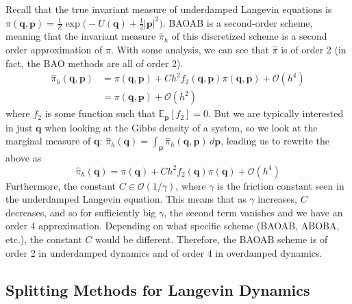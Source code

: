 \documentclass{article}
\begin{document}
      Recall that the true invariant measure of underdamped Langevin equations is $\pi(\mathbf{q}, \mathbf{p}) = \frac{1}{Z} \exp \big( -U(\mathbf{q}) + \frac{1}{2} |\mathbf{p}|^2 \big)$. BAOAB is a second-order scheme, meaning that the invariant measure $\hat{\pi}_h$ of this discretized scheme is a second order approximation of $\pi$. With some analysis, we can see that $\hat{\pi}$ is of order 2 (in fact, the BAO methods are all of order 2). 
      \begin{align*}
        \hat{\pi}_h (\mathbf{q}, \mathbf{p}) & = \pi(\mathbf{q}, \mathbf{p}) + C h^2 f_2 (\mathbf{q}, \mathbf{p}) \pi(\mathbf{q}, \mathbf{p}) + \mathcal{O}(h^4) \\
        & = \pi(\mathbf{q}, \mathbf{p}) + \mathcal{O}(h^2)
      \end{align*}
      where $f_2$ is some function such that $\mathbb{E}_\mathbf{p} [f_2] = 0$. But we are typically interested in just $\mathbf{q}$ when looking at the Gibbs density of a system, so we look at the marginal measure of $\mathbf{q}$: $\hat{\pi}_h (\mathbf{q}) = \int_\mathbf{p} \hat{\pi}_h (\mathbf{q}, \mathbf{p})\, d\mathbf{p}$, leading us to rewrite the above as
      \begin{equation}
        \hat{\pi}_h (\mathbf{q}) = \pi(\mathbf{q}) + C h^2 f_2 (\mathbf{q}) \pi(\mathbf{q}) + \mathcal{O}(h^4)
      \end{equation}
      Furthermore, the constant $C \in \mathcal{O}(1/ \gamma)$, where $\gamma$ is the friction constant seen in the underdamped Langevin equation. This means that as $\gamma$ increases, $C$ decreases, and so for sufficiently big $\gamma$, the second term vanishes and we have an order 4 approximation. Depending on what specific scheme (BAOAB, ABOBA, etc.), the constant $C$ would be different. Therefore, the BAOAB scheme is of order 2 in underdamped dynamics and of order 4 in overdamped dynamics. 

  \subsection{Splitting Methods for Langevin Dynamics}
\end{document}
